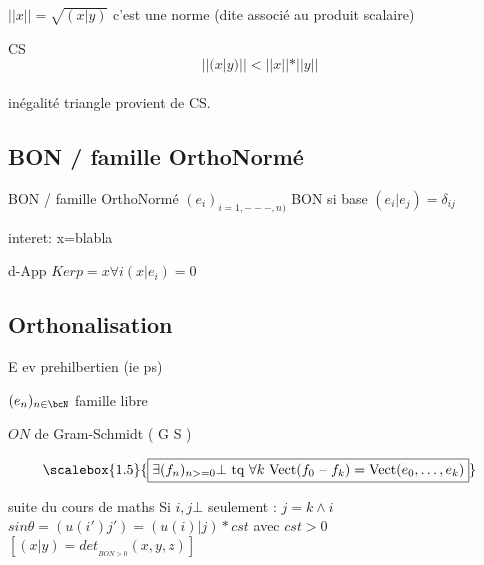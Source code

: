 \documentclass[a4paper,french,bookmarks]{book}
\begin{document}
    $||x|| = \sqrt{(x|y)}$ c'est une norme (dite associé au produit scalaire)
    
    CS $$||(x|y)|| <  ||x|| * ||y||$$ \\
    
    
    inégalité triangle provient de CS.
    
    \subsection{BON / famille OrthoNormé}
    \begin{form}{BON / famille OrthoNormé}{}
        $(e_i)_{i=1,---,n)}$ BON si base $(e_i|e_j) = \delta_{ij}$
        \vspace{1cm}

        interet:  x=blabla 
        
    \end{form}
    
    
    \begin{form}{d-App}{}   %
        $Ker p = {x \forall i (x|e_i)=0}  $
    \end{form}

    \subsection{Orthonalisation}
    
    \begin{definition}
        E ev prehilbertien (ie ps)
        
        $(e_n)_{n \in \bcN}$ famille libre 
        
        $ON$ de Gram-Schmidt ( G S )
        \begin{enumerate}
            \itt \[ \scalebox{1.5}{\boxed{\exists (f_n)_{n>=0}  \bot  \text{ tq } \forall k \text{  Vect(}f_0 \text{ \--- }f_k) = \text{Vect(}e_0,\dots,e_k)}}   \]
            
            
            \itt  
        \end{enumerate}

        
    \end{definition}

    \newpage
    
    \begin{form}{suite du cours de maths}{}
        Si $i,j \bot $ seulement : $j=k \wedge i $ \\
        
        $sin \theta = (u(i')j') = (u(i) | j) * cst $        avec $cst > 0$\\
        
        $[(x|y) = det_{_{BON>0}} (x,y,z)]$\\
    \end{form}
    
\end{document}
